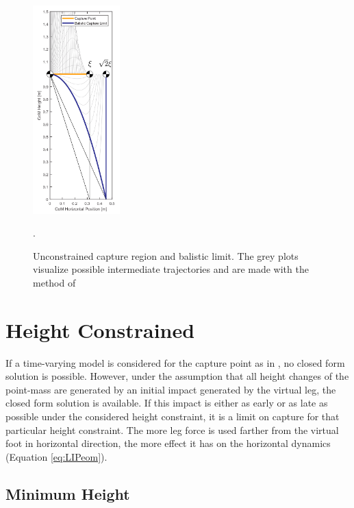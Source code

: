 \begin{figure}[h]
\centering
\includegraphics[width=0.3\textwidth]{STYLESTUFF/CPvsBalistic.png}
\caption{Unconstrained capture region and balistic limit. The grey plots visualize possible intermediate trajectories and are made with the method of \cite{koolen2016balance}}.
\label{fig:cpbal}
\end{figure}
\newpage



\section{Height Constrained}
If a time-varying model is considered for the capture point as in \cite{hopkins2014humanoid}, no closed form solution is possible. However, under the assumption that all height changes of the point-mass are generated by an initial impact generated by the virtual leg, the closed form solution is available. If this impact is either as early or as late as possible under the considered height constraint, it is a limit on capture for that particular height constraint. The more leg force is used farther from the virtual foot in horizontal direction, the more effect it has on the horizontal dynamics (Equation \eqref{eq:LIPeom}).\\
\subsection{Minimum Height}

